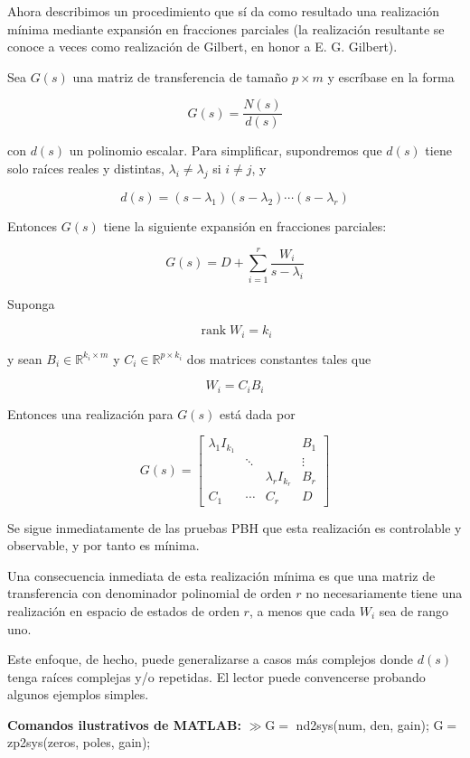 Ahora describimos un procedimiento que sí da como resultado una realización mínima mediante expansión en fracciones parciales (la realización resultante se conoce a veces como realización de Gilbert, en honor a E. G. Gilbert).

Sea $G(s)$ una matriz de transferencia de tamaño $p \times m$ y escríbase en la forma

$$
G(s)=\frac{N(s)}{d(s)}
$$

con $d(s)$ un polinomio escalar. Para simplificar, supondremos que $d(s)$ tiene solo raíces reales y distintas, $\lambda_{i} \neq \lambda_{j}$ si $i \neq j$, y

$$
d(s)=\left(s-\lambda_{1}\right)\left(s-\lambda_{2}\right) \cdots\left(s-\lambda_{r}\right)
$$

Entonces $G(s)$ tiene la siguiente expansión en fracciones parciales:

$$
G(s)=D+\sum_{i=1}^{r} \frac{W_{i}}{s-\lambda_{i}}
$$

Suponga

$$
\operatorname{rank} W_{i}=k_{i}
$$

y sean $B_{i} \in \mathbb{R}^{k_{i} \times m}$ y $C_{i} \in \mathbb{R}^{p \times k_{i}}$ dos matrices constantes tales que

$$
W_{i}=C_{i} B_{i}
$$

Entonces una realización para $G(s)$ está dada por

$$
G(s)=\left[\begin{array}{ccc|c}
\lambda_{1} I_{k_{1}} & & & B_{1} \\
& \ddots & & \vdots \\
& & \lambda_{r} I_{k_{r}} & B_{r} \\
\hline C_{1} & \cdots & C_{r} & D
\end{array}\right]
$$

Se sigue inmediatamente de las pruebas PBH que esta realización es controlable y observable, y por tanto es mínima.

Una consecuencia inmediata de esta realización mínima es que una matriz de transferencia con denominador polinomial de orden $r$ no necesariamente tiene una realización en espacio de estados de orden $r$, a menos que cada $W_{i}$ sea de rango uno.

Este enfoque, de hecho, puede generalizarse a casos más complejos donde $d(s)$ tenga raíces complejas y/o repetidas. El lector puede convencerse probando algunos ejemplos simples.

\textbf{Comandos ilustrativos de MATLAB:}
$\gg \mathrm{G}=$ nd2sys(num, den, gain); $\mathrm{G}=$ zp2sys(zeros, poles, gain);

